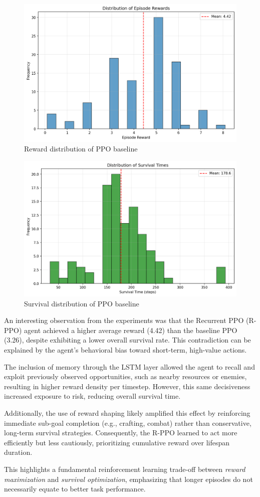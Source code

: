 \documentclass[twocolumn]{article}
\begin{document}
\begin{figure}[H]
    \centering
    \includegraphics[width=0.75\linewidth]{images/reward_distribution_ppo_improv2.png}
    \caption{Reward distribution of PPO baseline}
    \label{fig:placeholder}
\end{figure}
\begin{figure}[H]
    \centering
    \includegraphics[width=0.75\linewidth]{images/survival_distribution_ppo_improv2.png}
    \caption{Survival distribution of PPO baseline}
    \label{fig:placeholder}
\end{figure}

An interesting observation from the experiments was that the Recurrent PPO (R-PPO) agent achieved a higher average reward (4.42) than the baseline PPO (3.26), despite exhibiting a lower overall survival rate. This contradiction can be explained by the agent's behavioral bias toward short-term, high-value actions.

The inclusion of memory through the LSTM layer allowed the agent to recall and exploit previously observed opportunities, such as nearby resources or enemies, resulting in higher reward density per timestep. However, this same decisiveness increased exposure to risk, reducing overall survival time.

Additionally, the use of reward shaping likely amplified this effect by reinforcing immediate sub-goal completion (e.g., crafting, combat) rather than conservative, long-term survival strategies. Consequently, the R-PPO learned to act more efficiently but less cautiously, prioritizing cumulative reward over lifespan duration.

This highlights a fundamental reinforcement learning trade-off between \textit{reward maximization} and \textit{survival optimization}, emphasizing that longer episodes do not necessarily equate to better task performance.
\end{document}
